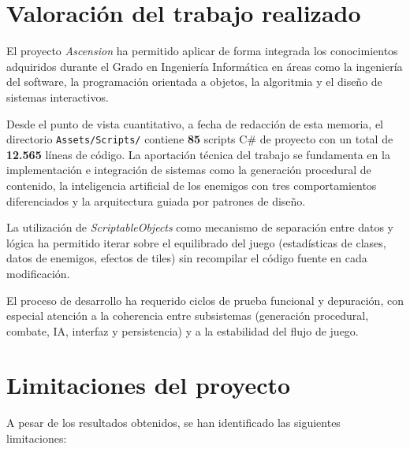 \section{Valoración del trabajo realizado}


El proyecto \textit{Ascension} ha permitido aplicar de forma integrada los conocimientos adquiridos durante el Grado en Ingeniería Informática en áreas como la ingeniería del software, la programación orientada a objetos, la algoritmia y el diseño de sistemas interactivos.

Desde el punto de vista cuantitativo, a fecha de redacción de esta memoria, el directorio \texttt{Assets/Scripts/} contiene \textbf{85} scripts C\# de proyecto con un total de \textbf{12.565} líneas de código. La aportación técnica del trabajo se fundamenta en la implementación e integración de sistemas como la generación procedural de contenido, la inteligencia artificial de los enemigos con tres comportamientos diferenciados y la arquitectura guiada por patrones de diseño.

La utilización de \textit{ScriptableObjects} como mecanismo de separación entre datos y lógica ha permitido iterar sobre el equilibrado del juego (estadísticas de clases, datos de enemigos, efectos de tiles) sin recompilar el código fuente en cada modificación.

El proceso de desarrollo ha requerido ciclos de prueba funcional y depuración, con especial atención a la coherencia entre subsistemas (generación procedural, combate, IA, interfaz y persistencia) y a la estabilidad del flujo de juego.



\section{Limitaciones del proyecto}


A pesar de los resultados obtenidos, se han identificado las siguientes limitaciones:

